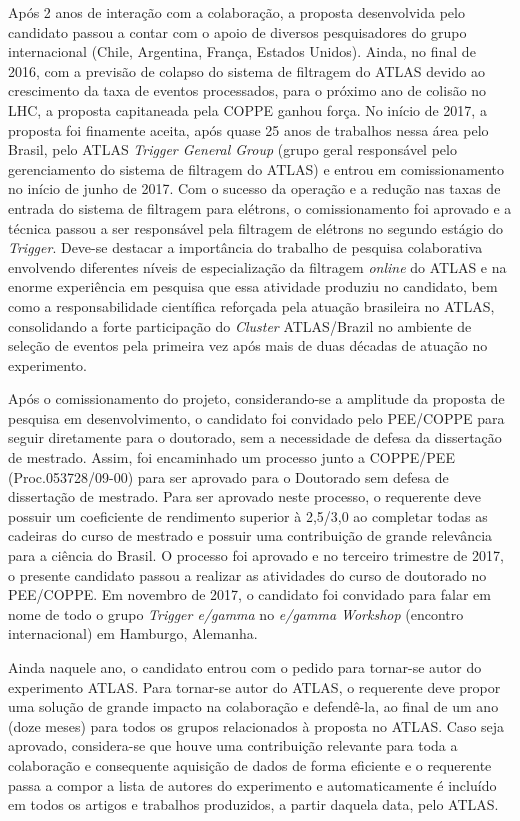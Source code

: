 Após 2 anos de interação com a colaboração, a proposta desenvolvida pelo candidato passou 
a contar com o apoio de diversos pesquisadores do grupo internacional (Chile, Argentina, França, Estados Unidos). 
Ainda, no final de 
2016, com a previsão de colapso do sistema de filtragem do ATLAS devido ao crescimento da 
taxa de eventos processados, para o próximo ano de colisão no LHC, a proposta capitaneada 
pela COPPE ganhou força. No início de 2017, a proposta foi finamente aceita, após quase 
25 anos de trabalhos nessa área pelo Brasil, pelo ATLAS \emph{Trigger General Group} (grupo geral responsável 
pelo gerenciamento do sistema de filtragem do ATLAS) e entrou em comissionamento no início de 
junho de 2017. Com o sucesso da operação e a redução nas taxas de entrada do sistema de 
filtragem para elétrons, o comissionamento foi aprovado e a técnica passou a ser responsável 
pela filtragem de elétrons no segundo estágio do \emph{Trigger}. Deve-se destacar a importância do 
trabalho de pesquisa colaborativa envolvendo diferentes níveis de especialização da filtragem 
\emph{online} do ATLAS e na enorme experiência em pesquisa que essa atividade produziu no 
candidato, bem como a responsabilidade científica reforçada pela atuação brasileira no 
ATLAS, consolidando a forte participação do \emph{Cluster} ATLAS/Brazil no ambiente de seleção 
de eventos pela primeira vez após mais de duas décadas de atuação no experimento.



Após o comissionamento do projeto, considerando-se a amplitude da proposta de pesquisa em 
desenvolvimento, o candidato foi convidado pelo PEE/COPPE para seguir diretamente para o 
doutorado, sem a necessidade de defesa da dissertação de mestrado. Assim, foi encaminhado 
um processo junto a COPPE/PEE (Proc.053728/09-00) para ser aprovado para o Doutorado sem 
defesa de dissertação de mestrado. Para ser aprovado neste processo, o requerente deve 
possuir um coeficiente de rendimento superior à 2,5/3,0 ao completar todas as cadeiras do 
curso de mestrado e possuir uma contribuição de grande relevância para a ciência do Brasil. 
O processo foi aprovado e no terceiro trimestre de 2017, o presente candidato passou a realizar 
as atividades do curso de doutorado no PEE/COPPE. Em novembro de 2017, o candidato foi convidado 
para falar em nome de todo o grupo \emph{Trigger e/gamma} no \emph{e/gamma Workshop} 
(encontro internacional) em Hamburgo, Alemanha.



Ainda naquele ano, o candidato entrou com o pedido para tornar-se autor do experimento ATLAS. 
Para tornar-se autor do ATLAS, o requerente deve propor uma solução de grande impacto na 
colaboração e defendê-la, ao final de um ano (doze meses) para todos os grupos relacionados 
à proposta no ATLAS.  Caso seja aprovado, considera-se que houve uma contribuição relevante 
para toda a colaboração e consequente aquisição de dados de forma eficiente e o requerente 
passa a compor a lista de autores do experimento e automaticamente é incluído em todos os 
artigos e trabalhos produzidos, a partir daquela data, pelo ATLAS. 



